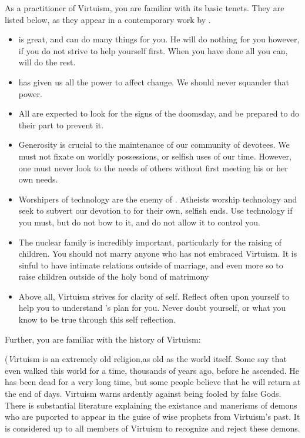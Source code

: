 \documentclass[blue]{guildcamp1}
\begin{document}
\name{\bVirtuism{}}

As a practitioner of Virtuism, you are familiar with its basic tenets. They are listed below, as they appear in a contemporary work by \cPastor{\MYname{}}.

\begin{itemize}
  \item \cGod{\MYname{}} is great, and can do many things for you. He will do nothing for you however, if you do not strive to help yourself first. When you have done all you can, \cGod{\MYname{}} will do the rest.
  
  \item \cGod{\MYname{}} has given us all the power to affect change. We should never squander that power. 
  
  \item All are expected to look for the signs of the doomsday, and be prepared to do their part to prevent it. 
  
  \item Generosity is crucial to the maintenance of our community of devotees. We must not fixate on worldly possessions, or selfish uses of our time. However, one must never look to the needs of others without first meeting his or her own needs.
  
  \item Worshipers of technology are the enemy of \cGod{}. Atheists worship technology and seek to subvert our devotion to \cGod{} for their own, selfish ends. Use technology if you must, but do not bow to it, and do not allow it to control you.
  
  \item The nuclear family is incredibly important, particularly for the raising of children. You should not marry anyone who has not embraced Virtuism. It is sinful to have intimate relations outside of marriage, and even more so to raise children outside of the holy bond of matrimony
  
  \item Above all, Virtuism strives for clarity of self. Reflect often upon yourself to help you to understand \cGod{}'s plan for you. Never doubt yourself, or what you know to be true through this self reflection.
\end{itemize}

Further, you are familiar with the history of Virtuism:

(\emph Virtuism is an extremely old religion,as old as the world itself. Some say that \cGod{} even walked this world for a time, thousands of years ago, before he ascended. He has been dead for a very long time, but some people believe that he will return at the end of days. Virtuism warns ardently against being fooled by false Gods. There is substantial literature explaining the existance and manerisms of demons who are puported to appear in the guise of wise prophets from Virtuism's past. It is considered up to all members of Virtuism to recognize and reject these demons.
\end{document}
